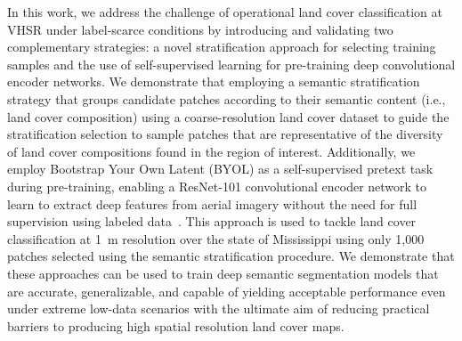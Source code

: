 In this work, we address the challenge of operational land cover classification at VHSR under label-scarce conditions by introducing and validating two complementary strategies: a novel stratification approach for selecting training samples and the use of self-supervised learning for pre-training deep convolutional encoder networks.
We demonstrate that employing a semantic stratification strategy that groups candidate patches according to their semantic content (i.e., land cover composition) using a coarse-resolution land cover dataset to guide the stratification selection to sample patches that are representative of the diversity of land cover compositions found in the region of interest.
Additionally, we employ Bootstrap Your Own Latent (BYOL) as a self-supervised pretext task during pre-training, enabling a ResNet-101 convolutional encoder network to learn to extract deep features from aerial imagery without the need for full supervision using labeled data~\citep{grillBootstrapYourOwn2020}.
This approach is used to tackle land cover classification at \SI{1}{\meter} resolution over the state of Mississippi using only 1,000 patches selected using the semantic stratification procedure.
We demonstrate that these approaches can be used to train deep semantic segmentation models that are accurate, generalizable, and capable of yielding acceptable performance even under extreme low-data scenarios with the ultimate aim of reducing practical barriers to producing high spatial resolution land cover maps.
